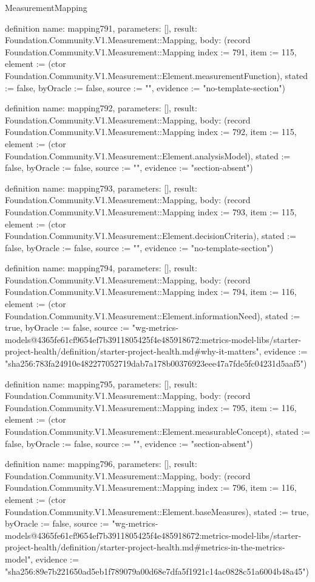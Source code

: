 \begin{lexlean}{MeasurementMapping}
\begin{semanticmodule}
definition{
  name: mapping791,
  parameters: [],
  result: Foundation.Community.V1.Measurement::Mapping,
  body: (record Foundation.Community.V1.Measurement::Mapping {index := 791, item := 115, element := (ctor Foundation.Community.V1.Measurement::Element.measurementFunction), stated := false, byOracle := false, source := "", evidence := "no-template-section"})
}

definition{
  name: mapping792,
  parameters: [],
  result: Foundation.Community.V1.Measurement::Mapping,
  body: (record Foundation.Community.V1.Measurement::Mapping {index := 792, item := 115, element := (ctor Foundation.Community.V1.Measurement::Element.analysisModel), stated := false, byOracle := false, source := "", evidence := "section-absent"})
}

definition{
  name: mapping793,
  parameters: [],
  result: Foundation.Community.V1.Measurement::Mapping,
  body: (record Foundation.Community.V1.Measurement::Mapping {index := 793, item := 115, element := (ctor Foundation.Community.V1.Measurement::Element.decisionCriteria), stated := false, byOracle := false, source := "", evidence := "no-template-section"})
}

definition{
  name: mapping794,
  parameters: [],
  result: Foundation.Community.V1.Measurement::Mapping,
  body: (record Foundation.Community.V1.Measurement::Mapping {index := 794, item := 116, element := (ctor Foundation.Community.V1.Measurement::Element.informationNeed), stated := true, byOracle := false, source := "wg-metrics-models@4365fe61cf9654ef7b3911805425f4e485918672:metrics-model-libs/starter-project-health/definition/starter-project-health.md#why-it-matters", evidence := "sha256:783fa24910e482277052719dab7a178b00376923eee47a7fde5fc04231d5aaf5"})
}

definition{
  name: mapping795,
  parameters: [],
  result: Foundation.Community.V1.Measurement::Mapping,
  body: (record Foundation.Community.V1.Measurement::Mapping {index := 795, item := 116, element := (ctor Foundation.Community.V1.Measurement::Element.measurableConcept), stated := false, byOracle := false, source := "", evidence := "section-absent"})
}

definition{
  name: mapping796,
  parameters: [],
  result: Foundation.Community.V1.Measurement::Mapping,
  body: (record Foundation.Community.V1.Measurement::Mapping {index := 796, item := 116, element := (ctor Foundation.Community.V1.Measurement::Element.baseMeasures), stated := true, byOracle := false, source := "wg-metrics-models@4365fe61cf9654ef7b3911805425f4e485918672:metrics-model-libs/starter-project-health/definition/starter-project-health.md#metrics-in-the-metrics-model", evidence := "sha256:89e7b221650ad5eb1f789079a00d68e7dfa5f1921c14ac0828c51a6004b48a45"})
}


\end{semanticmodule}
\end{lexlean}
